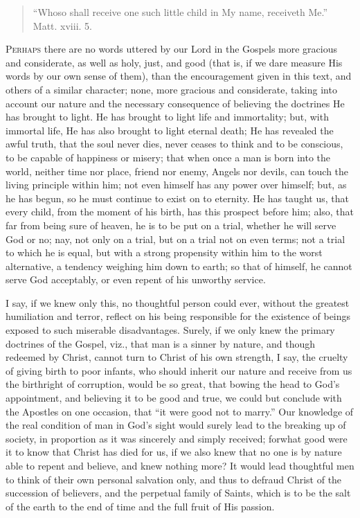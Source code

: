 
\begin{quote}

``Whoso shall receive one such little child in My name,
receiveth Me.'' Matt. xviii. 5.

\end{quote}

P\textsc{erhaps} there are no words uttered by our Lord in the Gospels more
gracious and considerate, as well as holy, just, and good (that is, if
we dare measure His words by our own sense of them), than the
encouragement given in this text, and others of a similar character;
none, more gracious and considerate, taking into account our nature
and the necessary consequence of believing the doctrines He has
brought to light. He has brought to light life and immortality; but,
with immortal life, He has also brought to light eternal death; He has
revealed the awful truth, that the soul never dies, never ceases to
think and to be conscious, to be capable of happiness or misery; that
when once a man is born into the world, neither time nor place, friend
nor enemy, Angels nor devils, can touch the living principle within
him; not even himself has any power over himself; but, as he has
begun, so he must continue to exist on to eternity. He has taught us,
that every child, from the moment of his birth, has this prospect
before him; also, that far from being sure of heaven, he is to be put
on a trial, whether he will serve God or no; nay, not only on a trial,
but on a trial not on even terms; not a trial to which he is equal,
but with a strong propensity within him to the worst alternative, a
tendency weighing him down to earth; so that of himself, he cannot
serve God acceptably, or even repent of his unworthy service.

I say, if we knew only this, no thoughtful person could ever,
without the greatest humiliation and terror, reflect on his being
responsible for the existence of beings exposed to such miserable
disadvantages. Surely, if we only knew the primary doctrines of the
Gospel, viz., that man is a sinner by nature, and though redeemed by
Christ, cannot turn to Christ of his own strength, I say, the cruelty
of giving birth to poor infants, who should inherit our nature and
receive from us the birthright of corruption, would be so great, that
bowing the head to God's appointment, and believing it to be good
and true, we could but conclude with the Apostles on one occasion,
that ``it were good not to marry.'' Our knowledge of the real
condition of man in God's sight would surely lead to the breaking up
of society, in proportion as it was sincerely and simply received; for\emph{}what good were it to know that Christ has died for us, if we also
knew that no one is by nature able to repent and believe, and knew
nothing more? It would lead thoughtful men to think of their own
personal salvation only, and thus to defraud Christ of the succession
of believers, and the perpetual family of Saints, which is to be the
salt of the earth to the end of time and the full fruit of His
passion.


